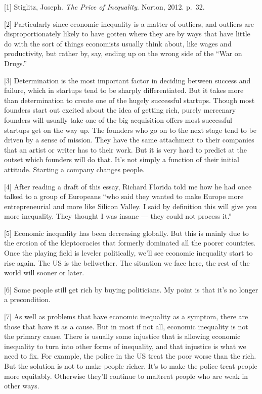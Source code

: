 {[}1{]} Stiglitz, Joseph. \emph{The Price of Inequality}. Norton, 2012.
p.~32.

{[}2{]} Particularly since economic inequality is a matter of outliers,
and outliers are disproportionately likely to have gotten where they are
by ways that have little do with the sort of things economists usually
think about, like wages and productivity, but rather by, say, ending up
on the wrong side of the ``War on Drugs.''

{[}3{]} Determination is the most important factor in deciding between
success and failure, which in startups tend to be sharply
differentiated. But it takes more than determination to create one of
the hugely successful startups. Though most founders start out excited
about the idea of getting rich, purely mercenary founders will usually
take one of the big acquisition offers most successful startups get on
the way up. The founders who go on to the next stage tend to be driven
by a sense of mission. They have the same attachment to their companies
that an artist or writer has to their work. But it is very hard to
predict at the outset which founders will do that. It's not simply a
function of their initial attitude. Starting a company changes people.

{[}4{]} After reading a draft of this essay, Richard Florida told me how
he had once talked to a group of Europeans ``who said they wanted to
make Europe more entrepreneurial and more like Silicon Valley. I said by
definition this will give you more inequality. They thought I was insane
--- they could not process it.''

{[}5{]} Economic inequality has been decreasing globally. But this is
mainly due to the erosion of the kleptocracies that formerly dominated
all the poorer countries. Once the playing field is leveler politically,
we'll see economic inequality start to rise again. The US is the
bellwether. The situation we face here, the rest of the world will
sooner or later.

{[}6{]} Some people still get rich by buying politicians. My point is
that it's no longer a precondition.

{[}7{]} As well as problems that have economic inequality as a symptom,
there are those that have it as a cause. But in most if not all,
economic inequality is not the primary cause. There is usually some
injustice that is allowing economic inequality to turn into other forms
of inequality, and that injustice is what we need to fix. For example,
the police in the US treat the poor worse than the rich. But the
solution is not to make people richer. It's to make the police treat
people more equitably. Otherwise they'll continue to maltreat people who
are weak in other ways.

